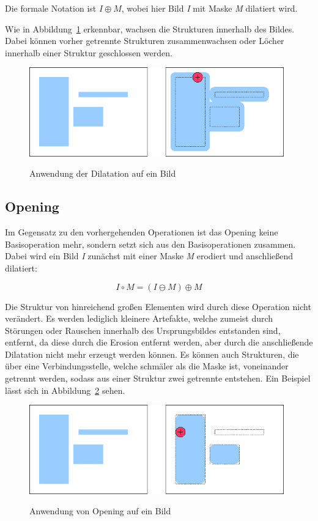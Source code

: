 Die formale Notation ist $ I \oplus M $, wobei hier Bild {\em I} mit Maske {\em M} dilatiert wird.

Wie in Abbildung~\ref{fig:Dilation} erkennbar, wachsen die Strukturen innerhalb des Bildes. Dabei können vorher getrennte Strukturen zusammenwachsen oder Löcher innerhalb einer Struktur geschlossen werden.

\begin{figure}[ht]
   \centering
     \includegraphics[width=11cm]{Bilder/MorphologicalDilation} \\
 \caption{Anwendung der Dilatation auf ein Bild}
 \label{fig:Dilation}
\end{figure}

\subsection{Opening}
Im Gegensatz zu den vorhergehenden Operationen ist das Opening keine Basisoperation mehr, sondern setzt sich aus den Basisoperationen zusammen.
Dabei wird ein Bild {\em I} zunächst mit einer Maske {\em M} erodiert und anschließend dilatiert:

$$ I \circ M = ( I \ominus M ) \oplus M $$

Die Struktur von hinreichend großen Elementen wird durch diese Operation nicht verändert. Es werden lediglich kleinere Artefakte, welche zumeist durch Störungen oder Rauschen innerhalb des Ursprungsbildes entstanden sind, entfernt, da diese durch die Erosion entfernt werden, aber durch die anschließende Dilatation nicht mehr erzeugt werden können. Es können auch Strukturen, die über eine Verbindungsstelle, welche schmäler als die Maske ist, voneinander getrennt werden, sodass aus einer Struktur zwei getrennte entstehen.
Ein Beispiel lässt sich in Abbildung~\ref{fig:Opening} sehen.

\begin{figure}[ht]
   \centering
     \includegraphics[width=11cm]{Bilder/MorphologicalOpening} \\
 \caption{Anwendung von Opening auf ein Bild}
 \label{fig:Opening}
\end{figure}

